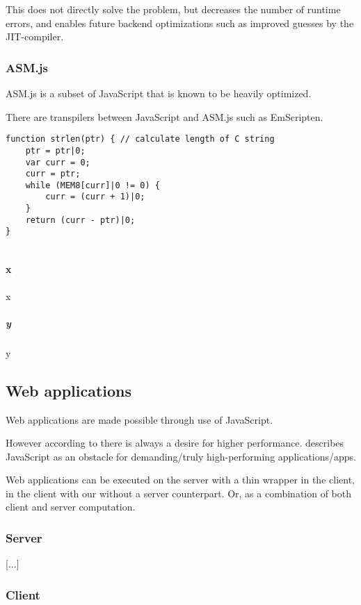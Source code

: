 This does not directly solve the problem, but decreases the number of runtime errors, and enables future backend optimizations such as improved guesses by the JIT-compiler.

\subsubsection{ASM.js}

ASM.js is a subset of JavaScript that is known to be heavily optimized.

There are transpilers between JavaScript and ASM.js such as EmScripten.

\begin{verbatim}
function strlen(ptr) { // calculate length of C string
    ptr = ptr|0;
    var curr = 0;
    curr = ptr;
    while (MEM8[curr]|0 != 0) {
        curr = (curr + 1)|0;
    }
    return (curr - ptr)|0;
}
    
\end{verbatim}

\paragraph{x}

x

\subparagraph{y}

y

\subsection{Web applications}

Web applications are made possible through use of JavaScript.

However according to \textcite{ReiserBlaser2017} there is always a desire for higher performance. \textcite{Zakai2018} describes JavaScript as an obstacle for demanding/truly high-performing applications/apps.

Web applications can be executed on the server with a thin wrapper in the client, in the client with our without a server counterpart. Or, as a combination of both client and server computation.

\subsubsection{Server}

[...]

\subsubsection{Client}

